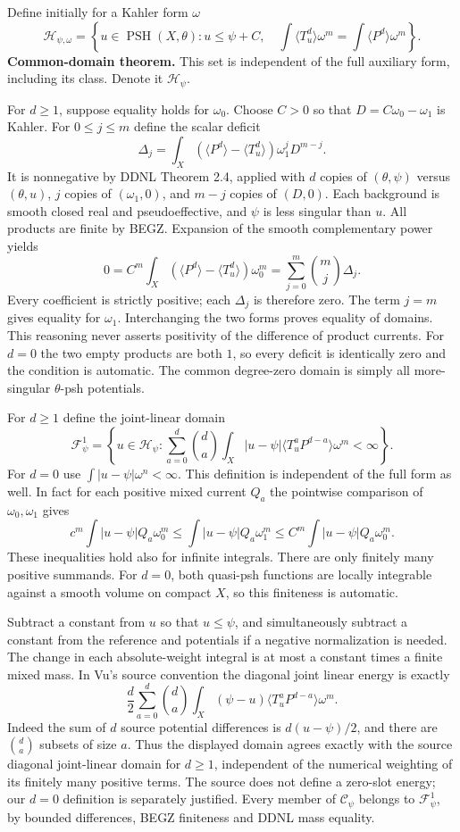 \documentclass[
  11pt,
]{article}
\begin{document}
Define initially for a Kahler form \(\omega\) \[
\mathcal H_{\psi,\omega}=\left\{u\in\operatorname{PSH}(X,\theta):u\leq\psi+C,
\quad\int\langle T_u^d\rangle\omega^m=\int\langle P^d\rangle\omega^m\right\}.
\] \textbf{Common-domain theorem.} This set is independent of the full
auxiliary form, including its class. Denote it \(\mathcal H_\psi\).

For \(d\geq1\), suppose equality holds for \(\omega_0\). Choose \(C>0\)
so that \(D=C\omega_0-\omega_1\) is Kahler. For \(0\leq j\leq m\) define
the scalar deficit \[
\Delta_j=\int_X(\langle P^d\rangle-\langle T_u^d\rangle)\omega_1^jD^{m-j}.
\] It is nonnegative by DDNL Theorem 2.4, applied with \(d\) copies of
\((\theta,\psi)\) versus \((\theta,u)\), \(j\) copies of
\((\omega_1,0)\), and \(m-j\) copies of \((D,0)\). Each background is
smooth closed real and pseudoeffective, and \(\psi\) is less singular
than \(u\). All products are finite by BEGZ. Expansion of the smooth
complementary power yields \[
0=C^m\int_X(\langle P^d\rangle-\langle T_u^d\rangle)\omega_0^m
=\sum_{j=0}^m\binom mj\Delta_j.
\] Every coefficient is strictly positive; each \(\Delta_j\) is
therefore zero. The term \(j=m\) gives equality for \(\omega_1\).
Interchanging the two forms proves equality of domains. This reasoning
never asserts positivity of the difference of product currents. For
\(d=0\) the two empty products are both \(1\), so every deficit is
identically zero and the condition is automatic. The common degree-zero
domain is simply all more-singular \(\theta\)-psh potentials.

For \(d\geq1\) define the joint-linear domain \[
\mathcal F^1_\psi=\left\{u\in\mathcal H_\psi:
\sum_{a=0}^d\binom da\int_X|u-\psi|\langle T_u^aP^{d-a}\rangle\omega^m<\infty\right\}.
\] For \(d=0\) use \(\int|u-\psi|\omega^n<\infty\). This definition is
independent of the full form as well. In fact for each positive mixed
current \(Q_a\) the pointwise comparison of \(\omega_0,\omega_1\) gives
\[
c^m\int|u-\psi|Q_a\omega_0^m\leq\int|u-\psi|Q_a\omega_1^m
\leq C^m\int|u-\psi|Q_a\omega_0^m.
\] These inequalities hold also for infinite integrals. There are only
finitely many positive summands. For \(d=0\), both quasi-psh functions
are locally integrable against a smooth volume on compact \(X\), so this
finiteness is automatic.

Subtract a constant from \(u\) so that \(u\leq\psi\), and simultaneously
subtract a constant from the reference and potentials if a negative
normalization is needed. The change in each absolute-weight integral is
at most a constant times a finite mixed mass. In Vu's source convention
the diagonal joint linear energy is exactly \[
\frac d2\sum_{a=0}^d\binom da\int_X(\psi-u)\langle T_u^aP^{d-a}\rangle\omega^m.
\] Indeed the sum of \(d\) source potential differences is
\(d(u-\psi)/2\), and there are \(\binom da\) subsets of size \(a\). Thus
the displayed domain agrees exactly with the source diagonal
joint-linear domain for \(d\geq1\), independent of the numerical
weighting of its finitely many positive terms. The source does not
define a zero-slot energy; our \(d=0\) definition is separately
justified. Every member of \(\mathcal C_\psi\) belongs to
\(\mathcal F^1_\psi\), by bounded differences, BEGZ finiteness and DDNL
mass equality.
\end{document}

